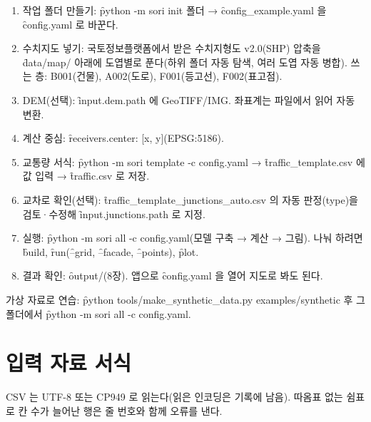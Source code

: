 \documentclass[10.5pt,a4paper]{article}
\begin{document}
\begin{enumerate}
\item 작업 폴더 만들기: \f{python -m sori init 폴더} → \f{config\_example.yaml} 을 \f{config.yaml} 로 바꾼다.
\item 수치지도 넣기: 국토정보플랫폼에서 받은 수치지형도 v2.0(SHP) 압축을 \f{data/map/} 아래에 도엽별로 푼다(하위 폴더 자동 탐색, 여러 도엽 자동 병합). 쓰는 층: B001(건물), A002(도로), F001(등고선), F002(표고점).
\item DEM(선택): \f{input.dem.path} 에 GeoTIFF/IMG. 좌표계는 파일에서 읽어 자동 변환.
\item 계산 중심: \f{receivers.center: [x, y]}(EPSG:5186).
\item 교통량 서식: \f{python -m sori template -c config.yaml} → \f{traffic\_template.csv} 에 값 입력 → \f{traffic.csv} 로 저장.
\item 교차로 확인(선택): \f{traffic\_template\_junctions\_auto.csv} 의 자동 판정(type)을 검토·수정해 \f{input.junctions.path} 로 지정.
\item 실행: \f{python -m sori all -c config.yaml}(모델 구축 → 계산 → 그림). 나눠 하려면 \f{build}, \f{run}(\f{--grid}, \f{--facade}, \f{--points}), \f{plot}.
\item 결과 확인: \f{output/}(8장). 앱으로 \f{config.yaml} 을 열어 지도로 봐도 된다.
\end{enumerate}
가상 자료로 연습: \f{python tools/make\_synthetic\_data.py examples/synthetic} 후 그 폴더에서 \f{python -m sori all -c config.yaml}.

\section{입력 자료 서식}
CSV 는 UTF-8 또는 CP949 로 읽는다(읽은 인코딩은 기록에 남음). 따옴표 없는 쉼표로 칸 수가 늘어난 행은 줄 번호와 함께 오류를 낸다.
\end{document}
